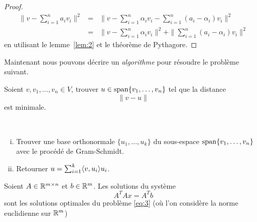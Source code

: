 \begin{proof}
  \begin{eqnarray*}
    \|v- \sum_{i=1}^n a_iv_i \|^2 & = &  \|v - \sum_{i=1}^n \alpha_iv_i  - \sum_{i=1}^n (a_i - \alpha_i)v_i \|^2 \\
                           & = & \|v - \sum_{i=1}^n \alpha_iv_i \|^2 + \| \sum_{i=1}^n (a_i - \alpha_i)v_i \|^2
  \end{eqnarray*}
en utilisant le lemme~\ref{lem:2} et le théorème de Pythagore. 
\end{proof}

\noindent 
Maintenant nous pouvons décrire un \emph{algorithme} pour résoudre le problème suivant. 
\begin{framed}
  \noindent 
  Soient $v,v_1,\dots,v_n \in V$, trouver $u \in \operatorname{span} \{v_1,\dots,v_n\}$ tel que la distance 
  \begin{displaymath}
    \|v - u\|
  \end{displaymath}
  est minimale. 
\end{framed}
\newpage
\begin{algorithm}
\label{alg:2}

~\\
\begin{enumerate}[i)]
\item Trouver une base orthonormale $\{u_1,\dots,u_k\}$ du sous-espace $\operatorname{span}\{v_1,\dots,v_n\}$ 
  avec le procédé de Gram-Schmidt. 
\item Retourner $ u = \sum_{i=1}^k \langle {v,u_i} \rangle u_i$. 
\end{enumerate}
\end{algorithm}






\begin{theorem}
  \label{thr:6}
  Soient $A \in \mathbb{R}^{m\times n}$ et $b \in \mathbb{R}^m$. Les solutions du système
  \begin{equation}
    \label{eq:4}    
    A^TAx = A^T b
  \end{equation}
  sont les solutions  optimales du problème \eqref{eq:3} (où l'on considère la norme euclidienne sur $\mathbb{R}^m$)
\end{theorem}

